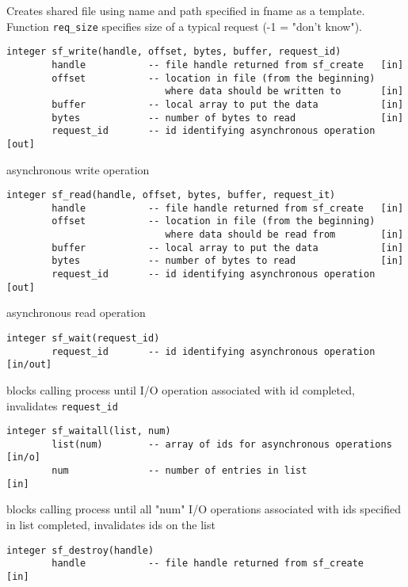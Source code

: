 Creates shared file using name and path specified in fname as a template.
Function {\tt req\_size} specifies size of a typical request (-1 = "don't know").


\begin{verbatim}
integer sf_write(handle, offset, bytes, buffer, request_id)
        handle           -- file handle returned from sf_create   [in]
        offset           -- location in file (from the beginning)
                            where data should be written to       [in]
        buffer           -- local array to put the data           [in]
        bytes            -- number of bytes to read               [in]
        request_id       -- id identifying asynchronous operation [out]
\end{verbatim}

asynchronous write operation


\begin{verbatim}
integer sf_read(handle, offset, bytes, buffer, request_it)
        handle           -- file handle returned from sf_create   [in]
        offset           -- location in file (from the beginning)
                            where data should be read from        [in]
        buffer           -- local array to put the data           [in]
        bytes            -- number of bytes to read               [in]
        request_id       -- id identifying asynchronous operation [out]
\end{verbatim}

asynchronous read operation


\begin{verbatim}
integer sf_wait(request_id)
        request_id       -- id identifying asynchronous operation [in/out]
\end{verbatim}

blocks calling process until I/O operation associated with id completed,
invalidates {\tt request\_id}


\begin{verbatim}
integer sf_waitall(list, num)
        list(num)        -- array of ids for asynchronous operations [in/o]
        num              -- number of entries in list                [in]
\end{verbatim}

blocks calling process until all "num" I/O operations associated with ids
specified in list completed, invalidates ids on the list


\begin{verbatim}
integer sf_destroy(handle)
        handle           -- file handle returned from sf_create      [in]
\end{verbatim}

